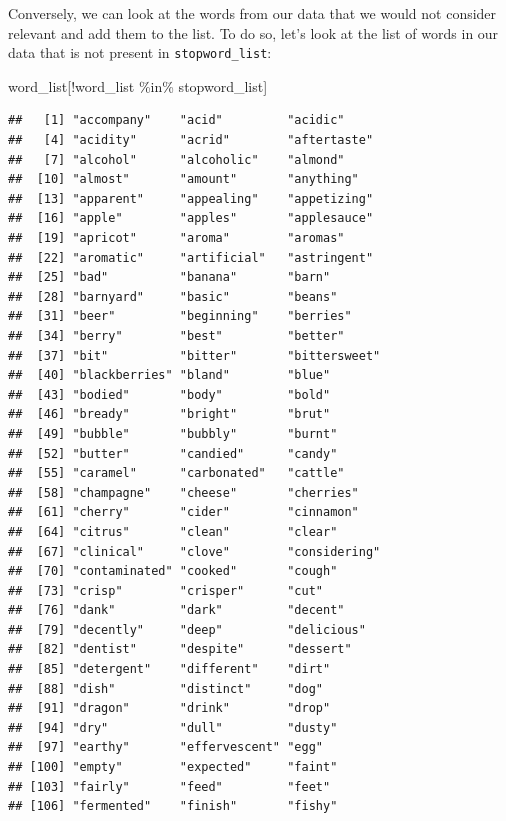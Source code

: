 \documentclass[
]{krantz}
\makeatletter
\newenvironment{Shaded}{\begin{snugshade}}{\end{snugshade}}
\newcommand{\NormalTok}[1]{#1}
\newcommand{\SpecialCharTok}[1]{\textcolor[rgb]{0,0,0}{#1}}
\newenvironment{kframe}{%
\medskip{}
\setlength{\fboxsep}{.8em}
 \def\at@end@of@kframe{}%
 \ifinner\ifhmode%
  \def\at@end@of@kframe{\end{minipage}}%
  \begin{minipage}{\columnwidth}%
 \fi\fi%
 \def\FrameCommand##1{\hskip\@totalleftmargin \hskip-\fboxsep
 \colorbox{shadecolor}{##1}\hskip-\fboxsep
     \hskip-\linewidth \hskip-\@totalleftmargin \hskip\columnwidth}%
 \MakeFramed {\advance\hsize-\width
   \@totalleftmargin\z@ \linewidth\hsize
   \@setminipage}}%
 {\par\unskip\endMakeFramed%
 \at@end@of@kframe}
\renewenvironment{Shaded}{\begin{kframe}}{\end{kframe}}
\makeatother
\begin{document}
Conversely, we can look at the words from our data that we would not consider relevant and add them to the list. To do so, let's look at the list of words in our data that is not present in \texttt{stopword\_list}:

\begin{Shaded}
\begin{Highlighting}[]
\NormalTok{word\_list[}\SpecialCharTok{!}\NormalTok{word\_list }\SpecialCharTok{\%in\%}\NormalTok{ stopword\_list]}
\end{Highlighting}
\end{Shaded}

\begin{verbatim}
##   [1] "accompany"    "acid"         "acidic"      
##   [4] "acidity"      "acrid"        "aftertaste"  
##   [7] "alcohol"      "alcoholic"    "almond"      
##  [10] "almost"       "amount"       "anything"    
##  [13] "apparent"     "appealing"    "appetizing"  
##  [16] "apple"        "apples"       "applesauce"  
##  [19] "apricot"      "aroma"        "aromas"      
##  [22] "aromatic"     "artificial"   "astringent"  
##  [25] "bad"          "banana"       "barn"        
##  [28] "barnyard"     "basic"        "beans"       
##  [31] "beer"         "beginning"    "berries"     
##  [34] "berry"        "best"         "better"      
##  [37] "bit"          "bitter"       "bittersweet" 
##  [40] "blackberries" "bland"        "blue"        
##  [43] "bodied"       "body"         "bold"        
##  [46] "bready"       "bright"       "brut"        
##  [49] "bubble"       "bubbly"       "burnt"       
##  [52] "butter"       "candied"      "candy"       
##  [55] "caramel"      "carbonated"   "cattle"      
##  [58] "champagne"    "cheese"       "cherries"    
##  [61] "cherry"       "cider"        "cinnamon"    
##  [64] "citrus"       "clean"        "clear"       
##  [67] "clinical"     "clove"        "considering" 
##  [70] "contaminated" "cooked"       "cough"       
##  [73] "crisp"        "crisper"      "cut"         
##  [76] "dank"         "dark"         "decent"      
##  [79] "decently"     "deep"         "delicious"   
##  [82] "dentist"      "despite"      "dessert"     
##  [85] "detergent"    "different"    "dirt"        
##  [88] "dish"         "distinct"     "dog"         
##  [91] "dragon"       "drink"        "drop"        
##  [94] "dry"          "dull"         "dusty"       
##  [97] "earthy"       "effervescent" "egg"         
## [100] "empty"        "expected"     "faint"       
## [103] "fairly"       "feed"         "feet"        
## [106] "fermented"    "finish"       "fishy"       

\end{verbatim}
\end{document}
